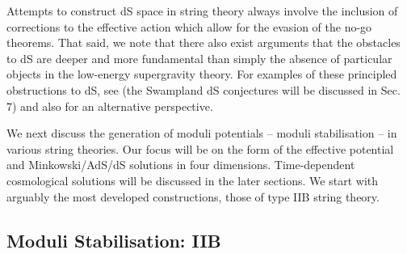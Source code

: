Attempts to construct dS space in string theory always involve the inclusion of corrections to the effective action which allow for the evasion of the no-go theorems. That said, we note that there also exist arguments that the obstacles to dS are deeper and more fundamental than simply the absence of particular objects in the low-energy supergravity theory. For examples of these principled obstructions to dS, see 
\cite{ Obied:2018sgi, Banks:2012hx, Banks:2019oiz, Brennan:2017rbf, Danielsson:2018ztv}  (the Swampland dS conjectures will be discussed in
Sec. 7) and also \cite{Sethi:2017phn} for an alternative perspective.

We next discuss the generation of moduli potentials -- moduli stabilisation -- in various string theories. Our focus will be on the form of the effective potential and Minkowski/AdS/dS solutions in four dimensions. Time-dependent cosmological solutions will be discussed in the later sections. We start with arguably the most developed constructions, those of type IIB string theory.

\subsection{Moduli Stabilisation: IIB}

\label{sec:dSstrings}

